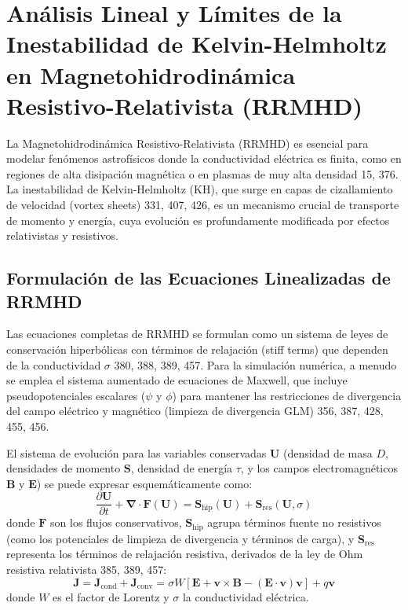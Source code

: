 
\section{Análisis Lineal y Límites de la Inestabilidad de Kelvin-Helmholtz en Magnetohidrodinámica Resistivo-Relativista (RRMHD)}
\label{sec:rrmhd_kh_analisis}

La Magnetohidrodinámica Resistivo-Relativista (RRMHD) es esencial para modelar fenómenos astrofísicos donde la conductividad eléctrica es finita, como en regiones de alta disipación magnética o en plasmas de muy alta densidad {15, 376}. La inestabilidad de Kelvin-Helmholtz (KH), que surge en capas de cizallamiento de velocidad (vortex sheets) {331, 407, 426}, es un mecanismo crucial de transporte de momento y energía, cuya evolución es profundamente modificada por efectos relativistas y resistivos.

\subsection{Formulación de las Ecuaciones Linealizadas de RRMHD}

Las ecuaciones completas de RRMHD se formulan como un sistema de leyes de conservación hiperbólicas con términos de relajación (stiff terms) que dependen de la conductividad $\sigma$ {380, 388, 389, 457}. Para la simulación numérica, a menudo se emplea el sistema aumentado de ecuaciones de Maxwell, que incluye pseudopotenciales escalares ($\psi$ y $\phi$) para mantener las restricciones de divergencia del campo eléctrico y magnético (limpieza de divergencia GLM) {356, 387, 428, 455, 456}.

El sistema de evolución para las variables conservadas $\mathbf{U}$ (densidad de masa $D$, densidades de momento $\mathbf{S}$, densidad de energía $\tau$, y los campos electromagnéticos $\mathbf{B}$ y $\mathbf{E}$) se puede expresar esquemáticamente como:
\begin{equation}
\label{eq:RRMHD_general}
\frac{\partial \mathbf{U}}{\partial t} + \mathbf{\nabla} \cdot \mathbf{F}(\mathbf{U}) = \mathbf{S}_{\text{hip}}(\mathbf{U}) + \mathbf{S}_{\text{res}}(\mathbf{U}, \sigma)
\end{equation}
donde $\mathbf{F}$ son los flujos conservativos, $\mathbf{S}_{\text{hip}}$ agrupa términos fuente no resistivos (como los potenciales de limpieza de divergencia y términos de carga), y $\mathbf{S}_{\text{res}}$ representa los términos de relajación resistiva, derivados de la ley de Ohm resistiva relativista {385, 389, 457}:
\begin{equation}
\label{eq:Ohm_resistive}
\mathbf{J} = \mathbf{J}_{\text{cond}} + \mathbf{J}_{\text{conv}} = \sigma W [\mathbf{E} + \mathbf{v} \times \mathbf{B} - (\mathbf{E} \cdot \mathbf{v})\mathbf{v}] + q\mathbf{v}
\end{equation}
donde $W$ es el factor de Lorentz y $\sigma$ la conductividad eléctrica.

